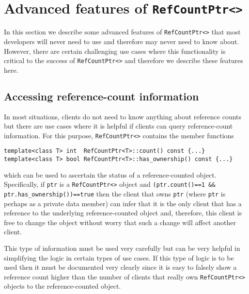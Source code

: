 %
\section{Advanced features of {}\texttt{RefCountPtr<>}}
%

In this section we describe some advanced features of
{}\texttt{RefCountPtr<>} that most developers will never need to use
and therefore may never need to know about.  However, there are
certain challenging use cases where this functionality is critical to
the success of {}\texttt{RefCountPtr<>} and therefore we describe
these features here.

%
\subsection{Accessing reference-count information}
%

In most situations, clients do not need to know anything about
reference counts but there are use cases where it is helpful if
clients can query reference-count information.  For this purpose,
{}\texttt{RefCountPtr<>} contains the member functions

{\scriptsize\begin{verbatim}
template<class T> int  RefCountPtr<T>::count() const {...}
template<class T> bool RefCountPtr<T>::has_ownership() const {...}
\end{verbatim}}

{}\noindent{}which can be used to ascertain the status of a
reference-counted object.  Specifically, if {}\texttt{ptr} is a
{}\texttt{RefCountPtr<>} object and {}\texttt{(ptr.count()==1 \&\&
ptr.has\_ownership())==true} then the client that owns {}\texttt{ptr}
(where {}\texttt{ptr} is perhaps as a private data member) can infer
that it is the only client that has a reference to the underlying
reference-counted object and, therefore, this client is free to change
the object without worry that such a change will affect another
client.

This type of information must be used very carefully but can be very
helpful in simplifying the logic in certain types of use cases. If this
type of logic is to be used then it must be documented very clearly
since it is easy to falsely show a reference count higher than the
number of clients that really own {}\texttt{RefCountPtr<>} objects to
the reference-counted object.

%
%
%
%


